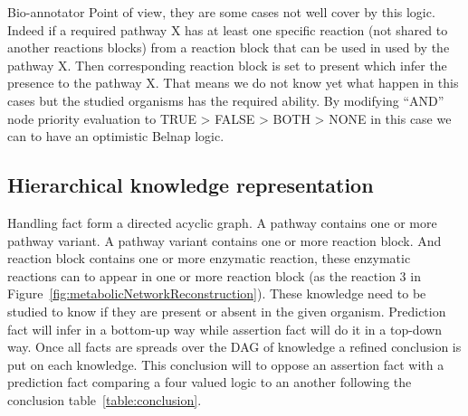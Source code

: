 \documentclass{llncs}
\begin{document}
Bio-annotator Point of view, they are some cases not well cover by this logic. Indeed if a required pathway X has at least one specific reaction (not shared to another reactions blocks) from a reaction block that can be used in used by the pathway X. Then corresponding reaction block is set to present which infer the presence to the pathway X. That means we do not know yet what happen in this cases but the studied organisms has the required ability. By modifying ``AND'' node priority evaluation to TRUE > FALSE > BOTH > NONE in this case we can to have an optimistic Belnap logic.

\subsection{Hierarchical knowledge representation}
Handling fact form a directed acyclic graph. A pathway contains one or more pathway variant. A pathway variant contains one or more reaction block. And reaction block contains one or more enzymatic reaction, these enzymatic reactions can to appear in one or more reaction block (as the reaction 3 in Figure~\ref{fig:metabolicNetworkReconstruction}). These knowledge need to be studied to know if they are present or absent in the given organism. Prediction fact will infer in a bottom-up way while assertion fact will do it in a top-down way. Once all facts are spreads over the DAG of knowledge a refined conclusion is put on each knowledge. This conclusion will to oppose an assertion fact with a prediction fact comparing a four valued logic to an another following the conclusion table~\ref{table:conclusion}.
\end{document}
